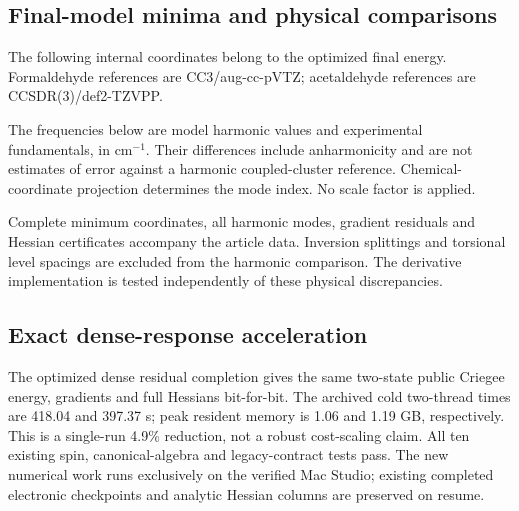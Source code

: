 \documentclass[11pt,a4paper]{article}
\begin{document}
\subsection{Final-model minima and physical comparisons}
The following internal coordinates belong to the optimized final energy.
Formaldehyde references are CC3/aug-cc-pVTZ; acetaldehyde references are
CCSDR(3)/def2-TZVPP.\cite{geometries2017}
\begin{center}\small\end{center}
The frequencies below are model harmonic values and experimental
fundamentals, in cm$^{-1}$. Their differences include anharmonicity and
are not estimates of error against a harmonic coupled-cluster reference.
Chemical-coordinate projection determines the mode index. No scale factor
is applied.\cite{formaldehydespectrum1969,acetaldehydespectrum1981}
\begin{center}\small\end{center}
Complete minimum coordinates, all harmonic modes, gradient residuals and
Hessian certificates accompany the article data. Inversion
splittings and torsional level spacings are excluded from the harmonic
comparison. The derivative implementation is tested independently of
these physical discrepancies.

\subsection{Exact dense-response acceleration}
The optimized dense residual completion gives the same two-state public
Criegee energy, gradients and full Hessians bit-for-bit. The archived
cold two-thread times are 418.04 and 397.37 s; peak resident memory is
1.06 and 1.19 GB, respectively. This is a single-run 4.9\% reduction,
not a robust cost-scaling claim. All ten existing spin, canonical-algebra
and legacy-contract tests pass. The new numerical work runs exclusively
on the verified Mac Studio; existing completed electronic checkpoints
and analytic Hessian columns are preserved on resume.


\clearpage
\end{document}
